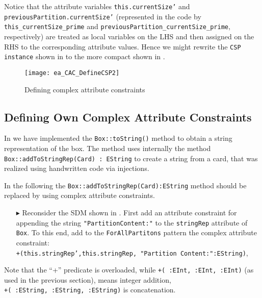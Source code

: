 Notice that the attribute variables \texttt{this.currentSize'} and \\
\texttt{previousPartition.currentSize'} (represented in the code by \\ 
\texttt{this\_currentSize\_prime} and \texttt{previousPartition\_currentSize\_prime}, respectively) are treated as local variables on the LHS and then assigned on the RHS to the corresponding attribute values.
Hence we might rewrite the \texttt{CSP instance} shown in  to the more compact shown in .
\begin{figure}[htbp]
\begin{center}
  \texttt{[image: ea\_CAC\_DefineCSP2]}
  \caption{Defining complex attribute constraints}  
  \label{ea:ea_CAC_DefineCSP2}
\end{center}
\end{figure}

\subsection{Defining Own Complex Attribute Constraints}  
In  we have implemented the \texttt{Box::toString()} method to obtain a string representation of the box. 
The method uses internally the method \texttt{Box::addToStringRep(Card) : EString} to create a string from a card, that was realized using handwritten code via injections.

In the following the \texttt{Box::addToStringRep(Card):EString} method should be replaced by using complex attribute constraints.

\begin{itemize}
  \item[$\blacktriangleright$] Reconsider the SDM shown in . First add an attribute constraint for appending the string \texttt{"PartitionContent:"} to the \texttt{stringRep} attribute of \texttt{ Box}. To this end, add to the \texttt{ForAllPartitons} pattern the complex attribute constraint:\\
\hspace*{0.5cm} \texttt{\small +(this.stringRep',this.stringRep, "Partition Content:":EString)},\\
\end{itemize}  
Note that the ``+'' predicate is overloaded, while \texttt{\small +( :EInt, :EInt, :EInt)} (as used in the previous section), means integer addition, \\
  \texttt{\small +( :EString, :EString, :EString)} is concatenation.
   	  


